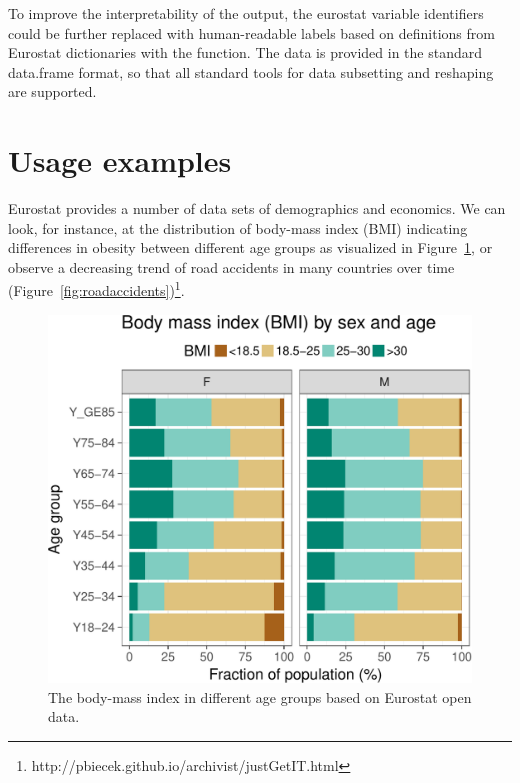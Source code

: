 To improve the interpretability of the output, the eurostat variable
identifiers could be further replaced with human-readable labels based
on definitions from Eurostat dictionaries with
the  function. The data is provided in the
standard data.frame format, so that all standard tools for data
subsetting and reshaping are supported.


\section{Usage examples}

Eurostat provides a number of data sets of demographics and
economics. We can look, for instance, at the distribution of body-mass
index (BMI) indicating differences in obesity between different age
groups as visualized in Figure~\ref{fig:bmi}, or observe a decreasing
trend of road accidents in many countries over time
(Figure~\ref{fig:roadaccidents})\footnote{http://pbiecek.github.io/archivist/justGetIT.html}.


\begin{figure}
\begin{center}
\includegraphics{2015-manu-bmi-1}
\end{center}
\caption{The body-mass index in different age groups based on Eurostat open data.}
\label{fig:bmi}
\end{figure}



